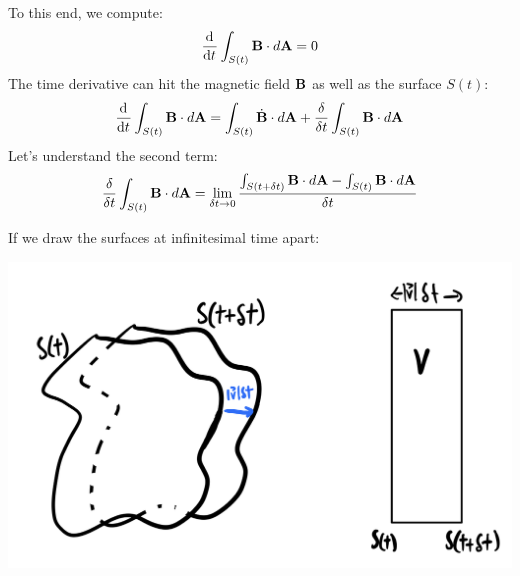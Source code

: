 To this end, we compute:
\begin{equation}
    \dod{}{t}\int_{S(t)}\v{B} \cdot d\v{A} = 0
\end{equation}
The time derivative can hit the magnetic field $\mathbf{B}$ as well as the surface $S(t)$:
\begin{equation}
    \dod{}{t}\int_{S(t)}\v{B} \cdot d\v{A} = \int_{S(t)} \dot{\v{B}} \cdot d\v{A} + \frac{\delta}{\delta t}\int_{S(t)}\v{B} \cdot d\v{A}
\end{equation}
Let's understand the second term:
\begin{equation}
    \frac{\delta}{\delta t}\int_{S(t)}\mathbf{B} \cdot d\mathbf{A} = \lim_{\delta t \to 0}\frac{\int_{S(t+\delta t)}\mathbf{B} \cdot d\mathbf{A} - \int_{S(t)}\mathbf{B} \cdot d\mathbf{A}}{\delta t}
\end{equation}

If we draw the surfaces at infinitesimal time apart:

\begin{center}
    \includegraphics[scale=0.35]{Lectures/Images/lec16-twosurfacesinfini.png}
\end{center}


